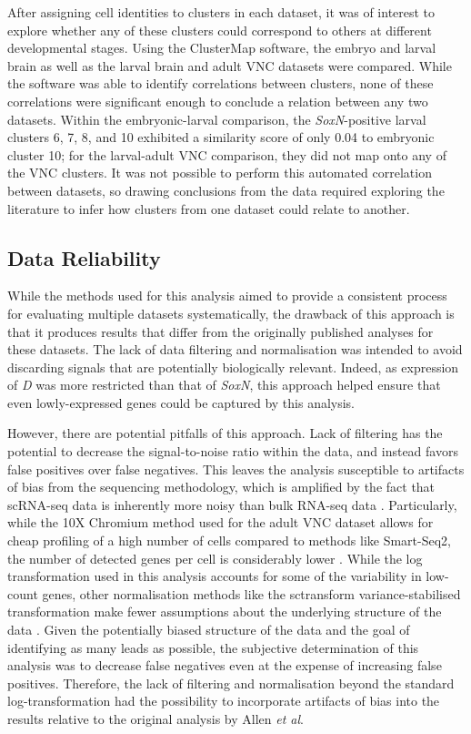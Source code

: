\documentclass[withindex,glossary]{cam-thesis}
\begin{document}
After assigning cell identities to clusters in each dataset, it was of
interest to explore whether any of these clusters could correspond to
others at different developmental stages. Using the ClusterMap software,
the embryo and larval brain as well as the larval brain and adult VNC
datasets were compared. While the software was able to identify
correlations between clusters, none of these correlations were
significant enough to conclude a relation between any two datasets.
Within the embryonic-larval comparison, the \emph{SoxN}-positive larval
clusters 6, 7, 8, and 10 exhibited a similarity score of only 0.04 to
embryonic cluster 10; for the larval-adult VNC comparison, they did not
map onto any of the VNC clusters. It was not possible to perform this
automated correlation between datasets, so drawing conclusions from the
data required exploring the literature to infer how clusters from one
dataset could relate to another.

\subsection{Data Reliability}

While the methods used for this analysis aimed to provide a consistent process for evaluating multiple datasets systematically, the drawback of this approach is that it produces results that differ from the originally published analyses for these datasets. The lack of data filtering and normalisation was intended to avoid discarding signals that are potentially biologically relevant. Indeed, as expression of \emph{D} was more restricted than that of \emph{SoxN}, this approach helped ensure that even lowly-expressed genes could be captured by this analysis. 

However, there are potential pitfalls of this approach. Lack of filtering has the potential to decrease the signal-to-noise ratio within the data, and instead favors false positives over false negatives. This leaves the analysis susceptible to artifacts of bias from the sequencing methodology, which is amplified by the fact that scRNA-seq data is inherently more noisy than bulk RNA-seq data . Particularly, while the 10X Chromium method used for the adult VNC dataset allows for cheap profiling of a high number of cells compared to methods like Smart-Seq2, the number of detected genes per cell is considerably lower . While the log transformation used in this analysis accounts for some of the variability in low-count genes, other normalisation methods like the sctransform variance-stabilised transformation make fewer assumptions about the underlying structure of the data . Given the potentially biased structure of the data and the goal of identifying as many leads as possible, the subjective determination of this analysis was to decrease false negatives even at the expense of increasing false positives. Therefore, the lack of filtering and normalisation beyond the standard log-transformation had the possibility to incorporate artifacts of bias into the results relative to the original analysis by Allen \emph{et al}.
\end{document}
